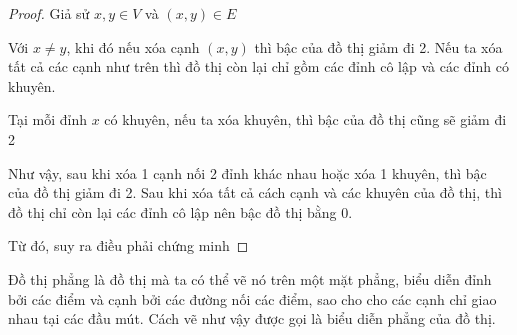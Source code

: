 \begin{proof}

    Giả sử $x,y \in V$ và $(x,y) \in E$

    \indent Với $x \neq y$, khi đó nếu xóa cạnh $(x,y)$ thì bậc của đồ thị giảm đi 2. Nếu ta xóa tất cả các cạnh như trên thì đồ thị còn lại chỉ gồm các đỉnh cô lập và các đỉnh có khuyên.

    Tại mỗi đỉnh $x$ có khuyên, nếu ta xóa khuyên, thì bậc của đồ thị cũng sẽ giảm đi 2

    Như vậy, sau khi xóa 1 cạnh nối 2 đỉnh khác nhau hoặc xóa 1 khuyên, thì bậc của đồ thị giảm đi 2. Sau khi xóa tất cả cách cạnh và các khuyên của đồ thị, thì đồ thị chỉ còn lại các đỉnh cô lập nên bậc đồ thị bằng 0.

    Từ đó, suy ra điều phải chứng minh
\end{proof}

\begin{definition}
    Đồ thị phẳng là đồ thị mà ta có thể vẽ nó trên một mặt phẳng, biểu diễn đỉnh bởi các điểm và cạnh bởi các đường nối các điểm, sao cho cho các cạnh chỉ giao nhau tại các đầu mút.
    Cách vẽ như vậy được gọi là biểu diễn phẳng của đồ thị.
\end{definition}

